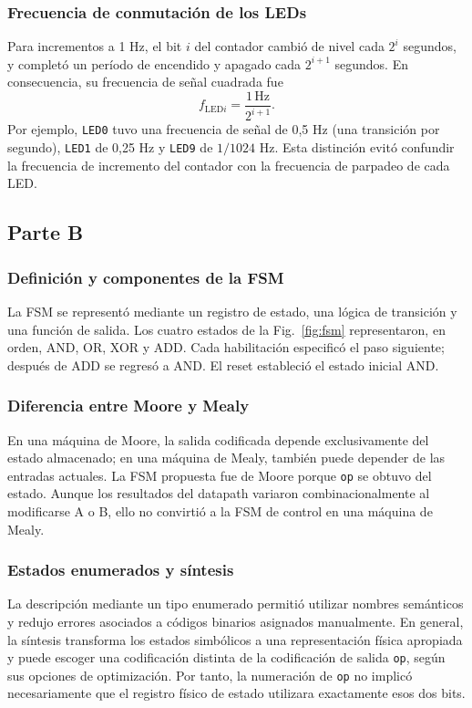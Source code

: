 \subsubsection{Frecuencia de conmutación de los LEDs}
Para incrementos a 1 Hz, el bit \(i\) del contador cambió de nivel cada \(2^i\) segundos, y completó un período de encendido y apagado cada \(2^{i+1}\) segundos. En consecuencia, su frecuencia de señal cuadrada fue
\begin{equation}
f_{\mathrm{LED}i}=\frac{1\,\mathrm{Hz}}{2^{i+1}}.
\end{equation}
Por ejemplo, \texttt{LED0} tuvo una frecuencia de señal de 0,5 Hz (una transición por segundo), \texttt{LED1} de 0,25 Hz y \texttt{LED9} de \(1/1024\) Hz. Esta distinción evitó confundir la frecuencia de incremento del contador con la frecuencia de parpadeo de cada LED.

\subsection{Parte B}
\subsubsection{Definición y componentes de la FSM}
La FSM se representó mediante un registro de estado, una lógica de transición y una función de salida. Los cuatro estados de la Fig.~\ref{fig:fsm} representaron, en orden, AND, OR, XOR y ADD. Cada habilitación especificó el paso siguiente; después de ADD se regresó a AND. El reset estableció el estado inicial AND.

\subsubsection{Diferencia entre Moore y Mealy}
En una máquina de Moore, la salida codificada depende exclusivamente del estado almacenado; en una máquina de Mealy, también puede depender de las entradas actuales. La FSM propuesta fue de Moore porque \texttt{op} se obtuvo del estado. Aunque los resultados del datapath variaron combinacionalmente al modificarse A o B, ello no convirtió a la FSM de control en una máquina de Mealy.

\subsubsection{Estados enumerados y síntesis}
La descripción mediante un tipo enumerado permitió utilizar nombres semánticos y redujo errores asociados a códigos binarios asignados manualmente. En general, la síntesis transforma los estados simbólicos a una representación física apropiada y puede escoger una codificación distinta de la codificación de salida \texttt{op}, según sus opciones de optimización. Por tanto, la numeración de \texttt{op} no implicó necesariamente que el registro físico de estado utilizara exactamente esos dos bits.

